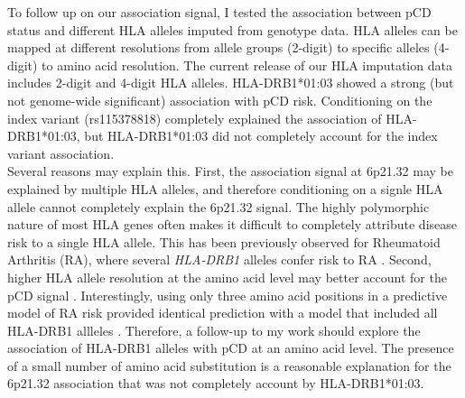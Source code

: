 To follow up on our association signal, I tested the association between pCD status and different HLA alleles imputed from genotype data. HLA alleles can be mapped at different resolutions from allele groups (2-digit) to specific alleles (4-digit) to amino acid resolution. The current release of our HLA imputation data includes 2-digit and 4-digit HLA alleles. HLA-DRB1*01:03 showed a strong (but not genome-wide significant) association with pCD risk. Conditioning on the index variant (rs115378818) completely explained the association of HLA-DRB1*01:03, but HLA-DRB1*01:03 did not completely account for the index variant association. \\

Several reasons may explain this. First, the association signal at 6p21.32 may be explained by multiple HLA alleles, and therefore conditioning on a signle HLA allele cannot completely explain the 6p21.32 signal. The highly polymorphic nature of most HLA genes often makes it difficult to completely attribute disease risk to a single HLA allele. This has been previously observed for Rheumatoid Arthritis (RA), where several \textit{HLA-DRB1} alleles confer risk to RA \cite{Van_Drongelen2017-dh}. Second, higher HLA allele resolution at the amino acid level may better account for the pCD signal \cite{Molineros2019-mu}. Interestingly, using only three amino acid positions in a predictive model of RA risk provided identical prediction with a model that included all HLA-DRB1 allleles \cite{Raychaudhuri2012-em}. Therefore, a follow-up to my work should explore the association of HLA-DRB1 alleles with pCD at an amino acid level. The presence of a small number of amino acid substitution is a reasonable explanation for the 6p21.32 association that was not completely account by HLA-DRB1*01:03.\\







